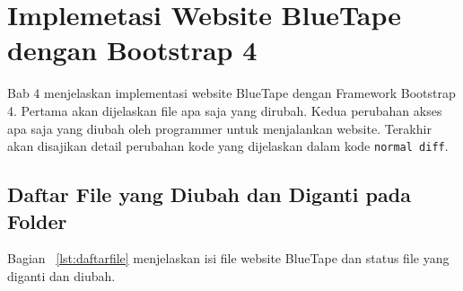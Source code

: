 \chapter{Implemetasi Website BlueTape dengan Bootstrap 4}
Bab 4 menjelaskan implementasi website BlueTape dengan Framework Bootstrap 4. Pertama akan dijelaskan file apa saja yang dirubah. Kedua perubahan akses apa saja yang diubah oleh programmer untuk menjalankan website. Terakhir akan disajikan detail perubahan kode yang dijelaskan dalam kode \texttt{normal diff}.

\section{Daftar File yang Diubah dan Diganti pada Folder}
Bagian ~\ref{lst:daftarfile} menjelaskan isi file website BlueTape dan status file yang diganti dan diubah.
